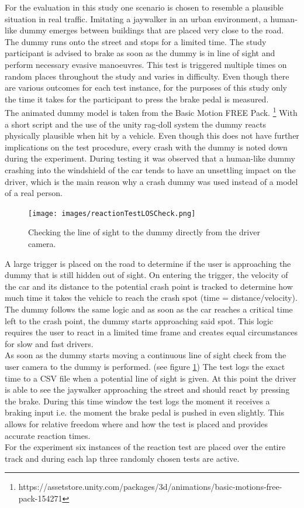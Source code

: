For the evaluation in this study one scenario is chosen to resemble a plausible situation in real traffic.
Imitating a jaywalker in an urban environment, a human-like dummy emerges between buildings that are placed very close to the road.
The dummy runs onto the street and stops for a limited time. 
The study participant is advised to brake as soon as the dummy is in line of sight and perform necessary evasive manoeuvres.
This test is triggered multiple times on random places throughout the study and varies in difficulty. 
Even though there are various outcomes for each test instance, for the purposes of this study only the time it takes for the participant to press the brake pedal is measured.
\\
The animated dummy model is taken from the Basic Motion FREE Pack. \footnote{https://assetstore.unity.com/packages/3d/animations/basic-motions-free-pack-154271}
With a short script and the use of the unity rag-doll system the dummy reacts physically plausible when hit by a vehicle.
Even though this does not have further implications on the test procedure, every crash with the dummy is noted down during the experiment.
During testing it was observed that a human-like dummy crashing into the windshield of the car tends to have an unsettling impact on the driver, which is the main reason why a crash dummy was used instead of a model of a real person. 
\begin{figure}[h]
    \centering
	\texttt{[image: images/reactionTestLOSCheck.png]}
	\caption[
		Reaction test LOS check
	]{
		Checking the line of sight to the dummy directly from the driver camera. 
	}
	\label{figure:LOSCheck}
\end{figure}
A large trigger is placed on the road to determine if the user is approaching the dummy that is still hidden out of sight.
On entering the trigger, the velocity of the car and its distance to the potential crash point is tracked to determine how much time it takes the vehicle to reach the crash spot (time = distance/velocity).
The dummy follows the same logic and as soon as the car reaches a critical time left to the crash point, the dummy starts approaching said spot.
This logic requires the user to react in a limited time frame and creates equal circumstances for slow and fast drivers.
\\
As soon as the dummy starts moving a continuous line of sight check from the user camera to the dummy is performed. (see figure \ref{figure:LOSCheck})
The test logs the exact time to a CSV file when a potential line of sight is given.
At this point the driver is able to see the jaywalker approaching the street and should react by pressing the brake.
During this time window the test logs the moment it receives a braking input i.e. the moment the brake pedal is pushed in even slightly. 
This allows for relative freedom where and how the test is placed and provides accurate reaction times.
\\
For the experiment six instances of the reaction test are placed over the entire track and during each lap three randomly chosen tests are active.


